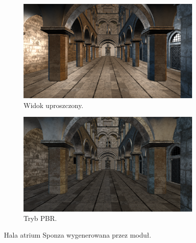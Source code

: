 \begin{figure}[h!]
	\centering
	\begin{subfigure}{.45\textwidth}
		\includegraphics[width=\textwidth]{images/demo_sponza_1.png}
		\caption{Widok uproszczony.}
	\end{subfigure}
	\begin{subfigure}{.45\textwidth}
		\includegraphics[width=\textwidth]{images/demo_sponza_1_pbr.png}
		\caption{Tryb PBR.}
	\end{subfigure}
	\caption{Hala atrium Sponza wygenerowana przez moduł.}
	\label{test_sponza_1}
\end{figure}

